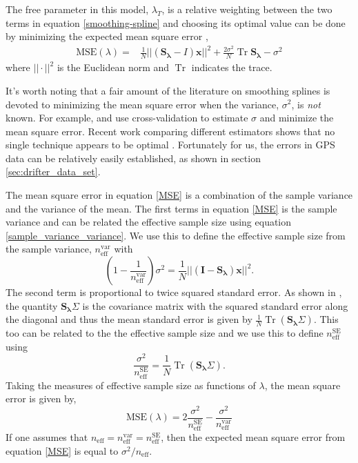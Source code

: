 \documentclass[10pt,journal]{IEEEtran}
\DeclareMathOperator{\Tr}{Tr}
\begin{document}
The free parameter in this model, $\lambda_T$, is a relative weighting between the two terms in equation \ref{smoothing-spline} and choosing its optimal value can be done by minimizing the expected mean square error \cite{craven1979-nm},
\begin{align}
\label{MSE}
    \textrm{MSE}(\lambda) =& \frac{1}{N} || \left( \mathbf{S_\lambda} - I \right) \mathbf{x} ||^2 + \frac{2 \sigma^2}{N}  \Tr \mathbf{S_\lambda} - \sigma^2
\end{align}
where $||\cdot||^2$ is the Euclidean norm and $\Tr$ indicates the trace.

It's worth noting that a fair amount of the literature on smoothing splines is devoted to minimizing the mean square error when the variance, $\sigma^2$, is \emph{not} known. For example, \cite{wahba1978-jrss-b} and \cite{craven1979-nm} use cross-validation to estimate $\sigma$ and minimize the mean square error. Recent work comparing different estimators shows that no single technique appears to be optimal \cite{lee2003-csda}. Fortunately for us, the errors in GPS data can be relatively easily established, as shown in section \ref{sec:drifter_data_set}.

The mean square error in equation \ref{MSE} is a combination of the sample variance and the variance of the mean. The first terms in equation \ref{MSE} is the sample variance and can be related the effective sample size using equation \ref{sample_variance_variance}. We use this to define the effective sample size from the sample variance, $n_{\textrm{eff}}^{\textrm{var}}$ with
\begin{equation}
\label{dof_var}
    \left(1-\frac{1}{n_{\textrm{eff}}^{\textrm{var}}} \right)\sigma^2 = \frac{1}{N} || \left( \mathbf{I} - \mathbf{S_\lambda} \right) \mathbf{x} ||^2.
\end{equation}
The second term is proportional to twice squared standard error. As shown in \cite{teanby2007-mg}, the quantity $\mathbf{S_\lambda} \Sigma$ is the covariance matrix with the squared standard error along the diagonal and thus the mean standard error is given by $\frac{1}{N} \Tr \left( \mathbf{S_\lambda} \Sigma \right)$. This too can be related to the the effective sample size and we use this to define $n_{\textrm{eff}}^{\textrm{SE}}$ using
\begin{equation}
\label{dof_se}
    \frac{\sigma^2}{n_{\textrm{eff}}^{\textrm{SE}}} = \frac{1}{N} \Tr \left( \mathbf{S_\lambda} \Sigma \right).
\end{equation}
Taking the measures of effective sample size as functions of $\lambda$, the mean square error is given by,
\begin{equation}
\label{MSE}
    \textrm{MSE}(\lambda) = 2\frac{\sigma^2}{n_{\textrm{eff}}^{\textrm{SE}}} - \frac{\sigma^2}{n_{\textrm{eff}}^{\textrm{var}}}
\end{equation}
If one assumes that $n_{\textrm{eff}} = n_{\textrm{eff}}^{\textrm{var}} = n_{\textrm{eff}}^{\textrm{SE}}$, then the expected mean square error from equation \ref{MSE} is equal to $\sigma^2/n_{\textrm{eff}}$.
\end{document}

